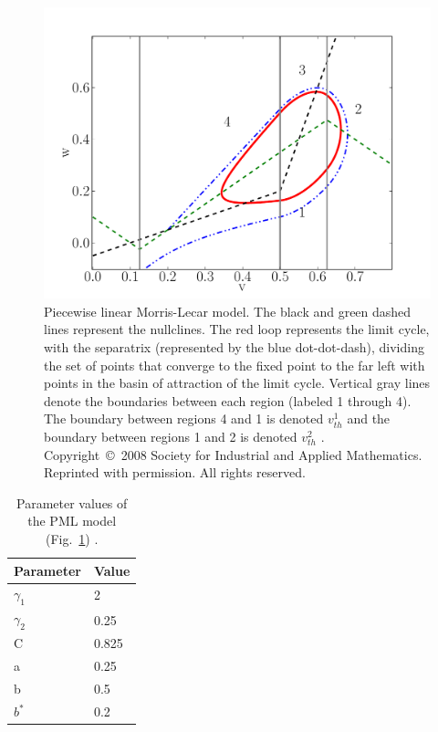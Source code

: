 \documentclass[12pt]{article}
\begin{document}
\begin{figure}[h!]
\begin{center}
 \includegraphics[width=1\textwidth]{pml_fig.pdf}
\end{center}
 \caption[Piecewise linear Morris-Lecar model]{Piecewise linear Morris-Lecar model.  The black and green dashed lines represent the nullclines.  The red loop represents the limit cycle, with the separatrix (represented by the blue dot-dot-dash), dividing the set of points that converge to the fixed point to the far left with points in the basin of attraction of the limit cycle.  Vertical gray lines denote the boundaries between each region (labeled 1 through 4).  The boundary between regions 4 and 1 is denoted $v_{th}^1$ and the boundary between regions 1 and 2 is denoted $v_{th}^2$ \cite{Coombes:2008:SIADS}. Copyright~\copyright~2008 Society for Industrial and Applied Mathematics.  Reprinted with permission.  All rights reserved.}
\label{fig:pml-appendix}\end{figure}


\begin{table}[h!]
\centering
\label{table:param}
\caption{Parameter values of the PML model (Fig.~\ref{fig:pml-appendix}) \cite{Coombes:2008:SIADS}.}
    \begin{tabular}{ l | l }
    \hline
    Parameter & Value \\ \hline
    $\gamma_1$ & 2 \\ \hline
    $\gamma_2$ & 0.25 \\ \hline
    C & 0.825 \\ \hline
    a & 0.25 \\ \hline
    b & 0.5 \\ \hline
    $b^*$ & 0.2

    \end{tabular}
\end{table}
\end{document}
